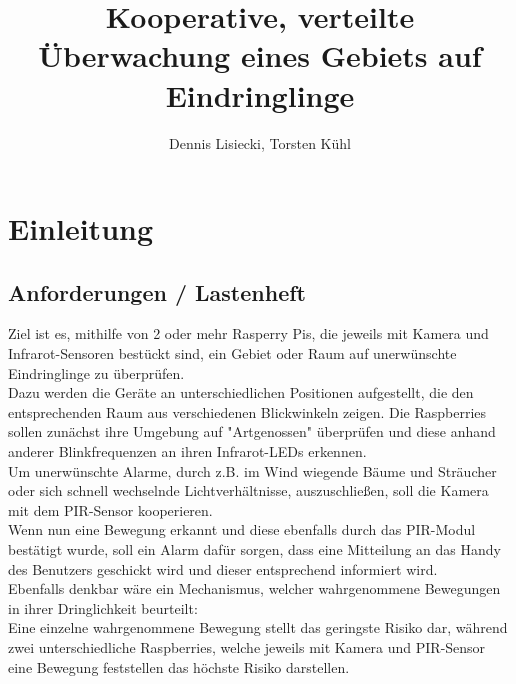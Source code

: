 \documentclass[12pt,a4paper]{scrreprt}
\title{Kooperative, verteilte Überwachung eines Gebiets auf Eindringlinge}
\author{Dennis Lisiecki, Torsten Kühl}
\begin{document}
\maketitle	%
\tableofcontents	%

\chapter{Einleitung}
\section{Anforderungen / Lastenheft}
Ziel ist es, mithilfe von 2 oder mehr Rasperry Pis, die jeweils mit Kamera und Infrarot-Sensoren bestückt sind, ein Gebiet oder Raum auf unerwünschte Eindringlinge zu überprüfen.\\
Dazu werden die Geräte an unterschiedlichen Positionen aufgestellt, die den entsprechenden Raum aus verschiedenen Blickwinkeln zeigen. Die Raspberries sollen zunächst ihre Umgebung auf "Artgenossen" überprüfen und diese anhand anderer Blinkfrequenzen an ihren Infrarot-LEDs erkennen. \\
Um unerwünschte Alarme, durch z.B. im Wind wiegende Bäume und Sträucher oder sich schnell wechselnde Lichtverhältnisse, auszuschließen, soll die Kamera mit dem PIR-Sensor kooperieren. \\
Wenn nun eine Bewegung erkannt und diese ebenfalls durch das PIR-Modul bestätigt wurde, soll ein Alarm dafür sorgen, dass eine Mitteilung an das Handy des Benutzers geschickt wird und dieser entsprechend informiert wird.\\
Ebenfalls denkbar wäre ein Mechanismus, welcher wahrgenommene Bewegungen in ihrer Dringlichkeit beurteilt:\\
Eine einzelne wahrgenommene Bewegung stellt das geringste Risiko dar, während zwei unterschiedliche Raspberries, welche jeweils mit Kamera und PIR-Sensor eine Bewegung feststellen das höchste Risiko darstellen.

\end{document}
